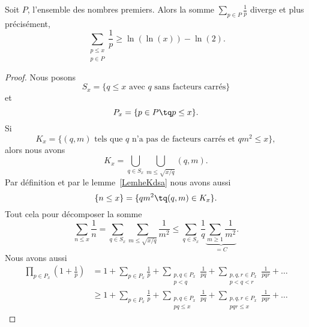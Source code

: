 \begin{theorem} \label{ThonfVruT}
    Soit \( P\), l'ensemble des nombres premiers. Alors la somme \( \sum_{p\in P}\frac{1}{ p }\) diverge et plus précisément,
    \begin{equation}
        \sum_{\substack{p\leq x\\p\in P}}\frac{1}{ p }\geq \ln(\ln(x))-\ln(2).
    \end{equation}
\end{theorem}

\begin{proof}
    Nous posons
    \begin{equation}
        S_x=\{  q\leq x\text{ avec } q\text{ sans facteurs carrés} \}
    \end{equation}
    et
    \begin{equation}
        P_x=\{ p\in P\tq p\leq x \}.
    \end{equation}
    Si
    \begin{equation}
        K_x=\{  (q,m)\text{ tels que } q\text{ n'a pas de facteurs carrés et } qm^2\leq x \},
    \end{equation}
    alors nous avons
    \begin{equation}
        K_x=\bigcup_{q\in S_x}\bigcup_{m\leq \sqrt{x/q}}(q,m).
    \end{equation}
    Par définition et par le lemme~\ref{LemheKdsa} nous avons aussi
    \begin{equation}
        \{ n\leq x \}=\{ qm^2\tq (q,m)\in K_x \}.
    \end{equation}
    Tout cela pour décomposer la somme
    \begin{equation}        \label{EqpoJpuC}
        \sum_{n\leq x}\frac{1}{ n }=\sum_{q\in S_x}\sum_{m\leq\sqrt{x/q}}\frac{1}{ m^2 }\leq \sum_{q\in S_x}\frac{1}{ q }\underbrace{\sum_{m\geq 1}\frac{1}{ m^2 }}_{=C}.
    \end{equation}
    Nous avons aussi
    \begin{subequations}
        \begin{align}
            \prod_{p\in P_x}\left( 1+\frac{1}{ p } \right)&=1+\sum_{p\in P_x}\frac{1}{ p }+\sum_{\substack{p,q\in P_x\\p<q}}\frac{1}{ pq }+\sum_{\substack{p,q,r\in P_x\\p<q<r}}\frac{1}{ pqr }+\ldots\\
            &\geq 1+\sum_{p\in P_x}\frac{1}{ p }+\sum_{\substack{p,q\in P_x\\pq\leq x}}\frac{1}{ pq }+\sum_{\substack{p,q,r\in P_x\\pqr\leq x}}\frac{1}{ pqr }+\ldots

\end{align}
\end{subequations}
\end{proof}

